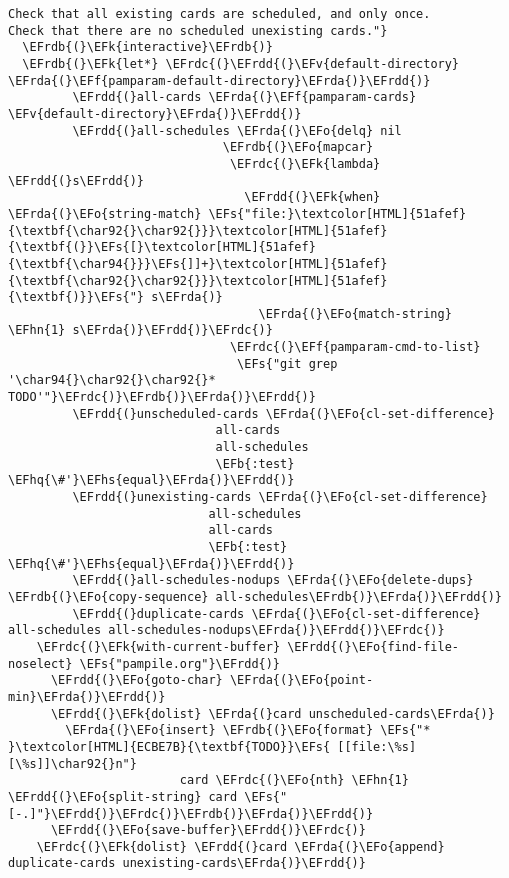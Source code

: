 \documentclass[a4wide,10pt]{article}
\newcommand{\EFs}[1]{\textcolor{EFs}{#1}} %
\newcommand{\EFk}[1]{\textcolor{EFk}{#1}} %
\newcommand{\EFb}[1]{\textcolor{EFb}{#1}} %
\newcommand{\EFf}[1]{\textcolor{EFf}{#1}} %
\newcommand{\EFv}[1]{\textcolor{EFv}{#1}} %
\newcommand{\EFo}[1]{\textcolor{EFo}{#1}} %
\newcommand{\EFhn}[1]{\textcolor{EFhn}{\textbf{#1}}} %
\newcommand{\EFhq}[1]{\textcolor{EFhq}{#1}} %
\newcommand{\EFhs}[1]{\textcolor{EFhs}{#1}} %
\newcommand{\EFrda}[1]{\textcolor{EFrda}{#1}} %
\newcommand{\EFrdb}[1]{\textcolor{EFrdb}{#1}} %
\newcommand{\EFrdc}[1]{\textcolor{EFrdc}{#1}} %
\newcommand{\EFrdd}[1]{\textcolor{EFrdd}{#1}} %
\begin{document}
\begin{Code}
\begin{Verbatim}
Check that all existing cards are scheduled, and only once.
Check that there are no scheduled unexisting cards."}
  \EFrdb{(}\EFk{interactive}\EFrdb{)}
  \EFrdb{(}\EFk{let*} \EFrdc{(}\EFrdd{(}\EFv{default-directory} \EFrda{(}\EFf{pamparam-default-directory}\EFrda{)}\EFrdd{)}
         \EFrdd{(}all-cards \EFrda{(}\EFf{pamparam-cards} \EFv{default-directory}\EFrda{)}\EFrdd{)}
         \EFrdd{(}all-schedules \EFrda{(}\EFo{delq} nil
                              \EFrdb{(}\EFo{mapcar}
                               \EFrdc{(}\EFk{lambda} \EFrdd{(}s\EFrdd{)}
                                 \EFrdd{(}\EFk{when} \EFrda{(}\EFo{string-match} \EFs{"file:}\textcolor[HTML]{51afef}{\textbf{\char92{}\char92{}}}\textcolor[HTML]{51afef}{\textbf{(}}\EFs{[}\textcolor[HTML]{51afef}{\textbf{\char94{}}}\EFs{]]+}\textcolor[HTML]{51afef}{\textbf{\char92{}\char92{}}}\textcolor[HTML]{51afef}{\textbf{)}}\EFs{"} s\EFrda{)}
                                   \EFrda{(}\EFo{match-string} \EFhn{1} s\EFrda{)}\EFrdd{)}\EFrdc{)}
                               \EFrdc{(}\EFf{pamparam-cmd-to-list}
                                \EFs{"git grep '\char94{}\char92{}\char92{}* TODO'"}\EFrdc{)}\EFrdb{)}\EFrda{)}\EFrdd{)}
         \EFrdd{(}unscheduled-cards \EFrda{(}\EFo{cl-set-difference}
                             all-cards
                             all-schedules
                             \EFb{:test} \EFhq{\#'}\EFhs{equal}\EFrda{)}\EFrdd{)}
         \EFrdd{(}unexisting-cards \EFrda{(}\EFo{cl-set-difference}
                            all-schedules
                            all-cards
                            \EFb{:test} \EFhq{\#'}\EFhs{equal}\EFrda{)}\EFrdd{)}
         \EFrdd{(}all-schedules-nodups \EFrda{(}\EFo{delete-dups} \EFrdb{(}\EFo{copy-sequence} all-schedules\EFrdb{)}\EFrda{)}\EFrdd{)}
         \EFrdd{(}duplicate-cards \EFrda{(}\EFo{cl-set-difference} all-schedules all-schedules-nodups\EFrda{)}\EFrdd{)}\EFrdc{)}
    \EFrdc{(}\EFk{with-current-buffer} \EFrdd{(}\EFo{find-file-noselect} \EFs{"pampile.org"}\EFrdd{)}
      \EFrdd{(}\EFo{goto-char} \EFrda{(}\EFo{point-min}\EFrda{)}\EFrdd{)}
      \EFrdd{(}\EFk{dolist} \EFrda{(}card unscheduled-cards\EFrda{)}
        \EFrda{(}\EFo{insert} \EFrdb{(}\EFo{format} \EFs{"* }\textcolor[HTML]{ECBE7B}{\textbf{TODO}}\EFs{ [[file:\%s][\%s]]\char92{}n"}
                        card \EFrdc{(}\EFo{nth} \EFhn{1} \EFrdd{(}\EFo{split-string} card \EFs{"[-.]"}\EFrdd{)}\EFrdc{)}\EFrdb{)}\EFrda{)}\EFrdd{)}
      \EFrdd{(}\EFo{save-buffer}\EFrdd{)}\EFrdc{)}
    \EFrdc{(}\EFk{dolist} \EFrdd{(}card \EFrda{(}\EFo{append} duplicate-cards unexisting-cards\EFrda{)}\EFrdd{)}

\end{Verbatim}
\end{Code}
\end{document}
